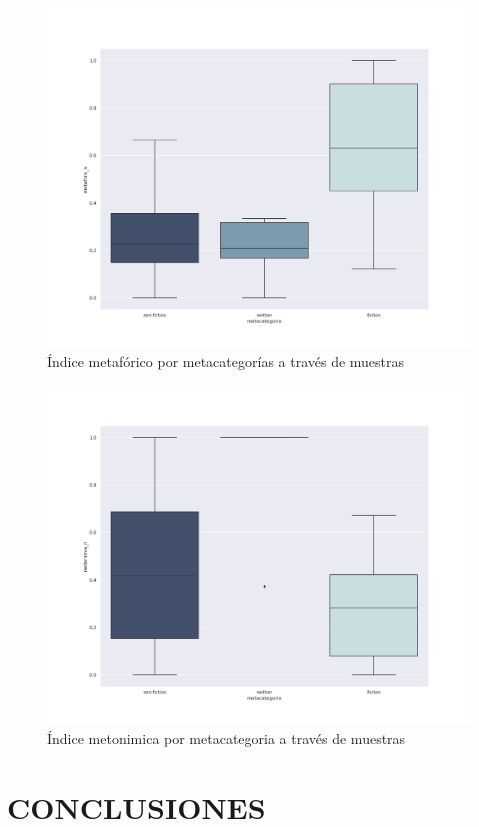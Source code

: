 \documentclass[twoside]{article}
\begin{document}
\begin{figure}[!H]
\centering
\includegraphics[width=0.9\linewidth]{./resultados/graphs/total/metafora_total.png}
\caption{\label{fig:metafora_total} Índice metafórico por metacategorías a través de muestras }
\end{figure}

\begin{figure}[!H]
\centering
\includegraphics[width=0.9\linewidth]{./resultados/graphs/total/metonimia_total.png}
\caption{\label{fig:metonimia_total} Índice metonimica por metacategoria a través de muestras }
\end{figure}

\section{CONCLUSIONES}
\label{sec:orgd4b63bf}
\end{document}
